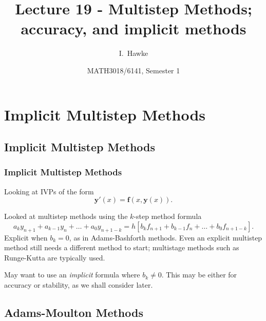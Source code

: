 \documentclass{beamer}
\title[Lecture 19] %
{Lecture 19 - Multistep Methods; accuracy, and implicit methods}
\author[I. Hawke] %
{I.~Hawke}
\institute[University of Southampton] %
{
  School of Mathematics, \\
  University of Southampton, UK
}
\date[Semester 1] %
{MATH3018/6141, Semester 1}
\newcommand{\by}{{\boldsymbol{y}}}
\newcommand{\bfm}[1]{{\boldsymbol{#1}}}
\begin{document}
\begin{frame}
  \titlepage
\end{frame}

\section{Implicit Multistep Methods}

\subsection{Implicit Multistep Methods}

\begin{frame}
  \frametitle{Implicit Multistep Methods}

  Looking at IVPs of the form
  \begin{equation*}
    \by'(x) = \bfm{f}(x, \by(x)).
  \end{equation*}

  Looked at multistep methods using the $k$-step method formula
  \begin{equation*}
    a_k y_{n+1} + a_{k-1} y_n + \dots + a_0 y_{n+1-k} = h \left[ b_k
      f_{n+1} + b_{k-1} f_n + \dots + b_0 f_{n+1-k} \right].
  \end{equation*}
  Explicit when $b_k = 0$, as in Adams-Bashforth methods.  \pause Even
  an explicit multistep method still needs a different method to
  start; multistage methods such as Runge-Kutta are typically
  used. \pause

  \vspace{1ex}

  May want to use an \emph{implicit} formula where $b_k \neq 0$. This
  may be either for accuracy or stability, as we shall consider later.

\end{frame}


\subsection{Adams-Moulton Methods}
\end{document}
